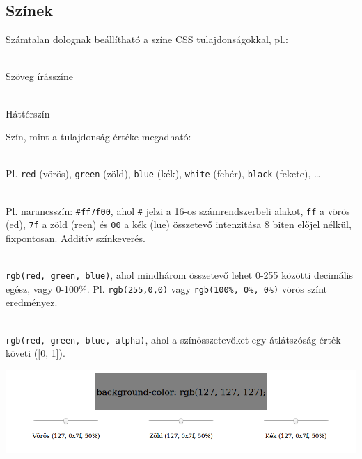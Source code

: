\subsection{Színek}

\begin{frame}
  Számtalan dolognak beállítható a színe CSS tulajdonságokkal, pl.:
  \begin{description}[m]
    \item[\texttt{color}] \hfill \\ Szöveg írásszíne
    \item[\texttt{background-color}] \hfill \\ Háttérszín
  \end{description}
  Szín, mint a tulajdonság értéke megadható:
  \begin{description}[m]
    \item[kulcsszavakkal] \hfill \\ Pl. \texttt{red} (vörös), 
    \texttt{green} (zöld), \texttt{blue} (kék), \texttt{white} (fehér), 
    \texttt{black} (fekete), \dots \\
    \item[Hexadecimálisan, RGB összetevőkkel] \hfill \\ Pl. 
    narancsszín: \texttt{\#ff7f00}, ahol \texttt{\#} jelzi a 16-os 
    számrendszerbeli alakot, \texttt{ff} a vörös (ed), 
    \texttt{7f} a zöld (reen) és \texttt{00} a kék 
    (lue) összetevő intenzitása 8 biten előjel nélkül, 
    fixpontosan. Additív színkeverés.
  \end{description}
\end{frame}

\begin{frame}
  \begin{description}[m]
    \item[\texttt{rgb()} függvénnyel] \hfill \\ \texttt{rgb(red, 
    green, blue)}, ahol mindhárom összetevő lehet 0-255 közötti 
    decimális egész, vagy 0-100\%. Pl. \texttt{rgb(255,0,0)} vagy 
    \texttt{rgb(100\%, 0\%, 0\%)} vörös színt eredményez.
    \item[\texttt{rgba()} függvénnyel] \hfill \\ \texttt{rgb(red, 
    green, blue, alpha)}, ahol a színösszetevőket egy 
    átlátszóság érték követi ([0, 1]).
  \end{description}
  \vfill
  \begin{center}
    \includegraphics[scale=0.2]{szinek1.png}\\
  \end{center}
\end{frame}

